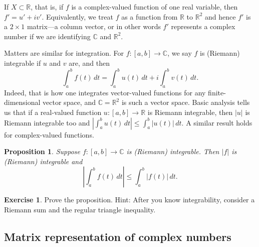 \documentclass[12pt,openany]{book}
\newcommand{\sabs}[1]{\lvert {#1} \rvert}
\newcommand{\abs}[1]{\left\lvert {#1} \right\rvert}
\newcommand{\C}{{\mathbb{C}}}
\newcommand{\R}{{\mathbb{R}}}
\theoremstyle{plain}
\newtheorem{prop}[thm]{Proposition}
\theoremstyle{remark}
\theoremstyle{definition}
\newenvironment{exbox}{%
    \def\FrameCommand{\vrule width 1pt \relax\hspace{10pt}}%
    \MakeFramed{\advance\hsize-\width\FrameRestore}%
}{%
    \endMakeFramed
}
\theoremstyle{exercise}
\newtheorem{exercise}{Exercise}[section]
\theoremstyle{example}
\begin{document}
If $X \subset \R$, that is, if $f$ is a complex-valued
function of one real variable, then $f' = u' + iv'$.
Equivalently, we treat $f$ as a function from $\R$ to $\R^2$
and hence $f'$ is a $2 \times 1$ matrix---a column vector, or in other words
$f'$ represents a complex number if we are identifying $\C$ and $\R^2$.

Matters are similar for integration.
For $f \colon [a,b] \to \C$,
we say $f$ is (Riemann) integrable if $u$ and $v$ are, and then
\begin{equation*}
\int_a^b f(t) \, dt = 
\int_a^b u(t) \, dt + i \int_a^b v(t) \, dt .
\end{equation*}
Indeed, that is how one integrates vector-valued functions
for any finite-dimensional vector space, and $\C = \R^2$ is such a vector space.
Basic analysis tells us that
if a
real-valued function $u \colon [a,b] \to \R$
is Riemann integrable,
then $\abs{u}$ is Riemann
integrable too and $\abs{\int_a^b u(t) \, dt} \leq \int_a^b \sabs{u(t)} \, dt$.
A similar result holds for complex-valued functions.

\begin{prop} \label{prop:inttriangleineq}
Suppose $f \colon [a,b] \to \C$ is (Riemann) integrable.  Then $\sabs{f}$ is
(Riemann) integrable and
\begin{equation*}
\abs{\int_a^b f(t) \, dt} \leq 
\int_a^b \abs{f(t)} \, dt .
\end{equation*}
\end{prop}

\begin{exbox}
\begin{exercise}%
Prove the proposition.  Hint: After you know integrability, consider
a Riemann sum and the regular triangle inequality.
\end{exercise}
\end{exbox}

\subsection{Matrix representation of complex numbers}
\end{document}
